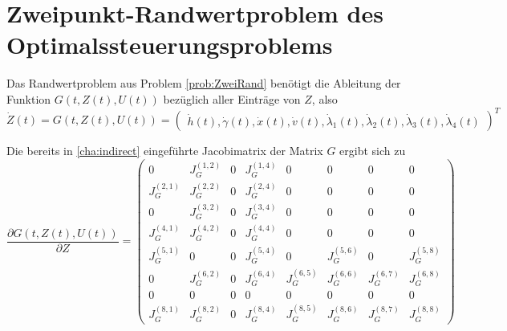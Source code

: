 \chapter{Zweipunkt-Randwertproblem des Optimalssteuerungsproblems} \label{Anhang:Jacobi}
Das Randwertproblem aus Problem \ref{prob:ZweiRand} benötigt die Ableitung der Funktion \(G(t, Z(t), U(t))\) bezüglich aller Einträge von \(Z\), also
\begin{equation} 
    \dot{Z}(t) = G(t,Z(t),U(t)) = 
    \begin{pmatrix}
        \dot{h}(t),\dot{\gamma}(t),\dot{x}(t),\dot{v}(t),\dot{\lambda}_1(t),\dot{\lambda}_2(t),\dot{\lambda}_3(t),\dot{\lambda}_4(t)
    \end{pmatrix}^T
\end{equation}

Die bereits in \autoref{cha:indirect} eingeführte Jacobimatrix der Matrix \(G\) ergibt sich zu
\begin{equation} \label{equ:jacobiB}
    \dfrac{\partial G(t,Z(t),U(t))}{\partial Z} = 
    \begin{pmatrix}
        0 & J_G^{(1,2)} & 0 & J_G^{(1,4)} & 0 & 0 & 0 & 0 \\ 
        J_G^{(2,1)} & J_G^{(2,2)} & 0 & J_G^{(2,4)} & 0 & 0 & 0 & 0 \\ 
        0 & J_G^{(3,2)} & 0 & J_G^{(3,4)} & 0 & 0 & 0 & 0 \\ 
        J_G^{(4,1)} & J_G^{(4,2)} & 0 & J_G^{(4,4)} & 0 & 0 & 0 & 0 \\
        J_G^{(5,1)} & 0 & 0 & J_G^{(5,4)} & 0 & J_G^{(5,6)} & 0 & J_G^{(5,8)} \\
        0 & J_G^{(6,2)} & 0 & J_G^{(6,4)} & J_G^{(6,5)} & J_G^{(6,6)} & J_G^{(6,7)} & J_G^{(6,8)} \\
        0 & 0 & 0 & 0 & 0 & 0 & 0 & 0 \\
        J_G^{(8,1)} & J_G^{(8,2)} & 0 & J_G^{(8,4)} & J_G^{(8,5)} & J_G^{(8,6)} & J_G^{(8,7)} & J_G^{(8,8)}
    \end{pmatrix}
\end{equation}

